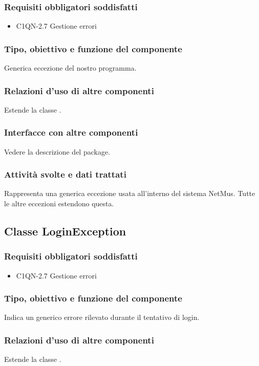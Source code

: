 \subsubsection*{Requisiti obbligatori soddisfatti}
\begin{itemize}
	\item C1QN-2.7 Gestione errori
\end{itemize}
\subsubsection*{Tipo, obiettivo e funzione del componente}
Generica eccezione del nostro programma.
\subsubsection*{Relazioni d'uso di altre componenti}
Estende la classe .
\subsubsection*{Interfacce con altre componenti}
Vedere la descrizione del package.
\subsubsection*{Attivit\`a svolte e dati trattati}
Rappresenta una generica eccezione usata all'interno del sistema NetMus. Tutte
le altre eccezioni estendono questa.

\subsection{Classe LoginException}
\subsubsection*{Requisiti obbligatori soddisfatti}
\begin{itemize}
	\item C1QN-2.7 Gestione errori
\end{itemize}
\subsubsection*{Tipo, obiettivo e funzione del componente}
Indica un generico errore rilevato durante il tentativo di login.
\subsubsection*{Relazioni d'uso di altre componenti}
Estende la classe .
